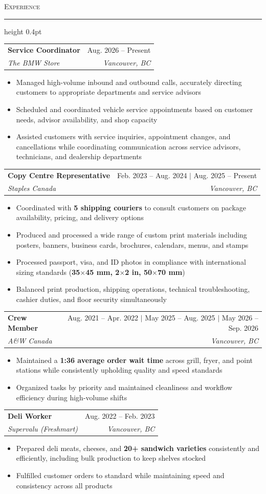 \documentclass[letterpaper,11pt]{article}
\makeatletter
\newcommand{\resumesection}[1]{%
  \vspace{4pt}%
  {\large\scshape #1}\vspace{1.5pt}%
  \hrule height 0.4pt%
  \vspace{3pt}%
}
\newcommand{\resumeSubheading}[4]{%
  \vspace{1.5pt}%
  \noindent\begin{tabular*}{\textwidth}{@{\extracolsep{\fill}}l r@{}}
    \textbf{#1} & #2 \\
    \textit{\small #3} & \textit{\small #4} \\
  \end{tabular*}\vspace{-4pt}%
}
\newcommand{\resumeItemListStart}{%
  \begin{itemize}%
    \setlength{\itemsep}{0.5pt}%
    \setlength{\parskip}{0pt}%
    \setlength{\parsep}{0pt}%
    \setlength{\topsep}{1.5pt}%
}
\newcommand{\resumeItemListEnd}{\end{itemize}\vspace{-3pt}}
\newcommand{\resumeItem}[1]{%
  \item\small{#1}%
}
\makeatother
\begin{document}
\newpage

\resumesection{Experience}

\resumeSubheading
  {Service Coordinator}{Aug. 2026 -- Present}
  {The BMW Store}{Vancouver, BC}
\resumeItemListStart
  \resumeItem{Managed high-volume inbound and outbound calls, accurately directing customers to appropriate departments and service advisors}
  \resumeItem{Scheduled and coordinated vehicle service appointments based on customer needs, advisor availability, and shop capacity}
  \resumeItem{Assisted customers with service inquiries, appointment changes, and cancellations while coordinating communication across service advisors, technicians, and dealership departments}
\resumeItemListEnd

\resumeSubheading
  {Copy Centre Representative}{Feb. 2023 -- Aug. 2024 $|$ Aug. 2025 -- Present}
  {Staples Canada}{Vancouver, BC}
\resumeItemListStart
  \resumeItem{Coordinated with \textbf{5 shipping couriers} to consult customers on package availability, pricing, and delivery options}
  \resumeItem{Produced and processed a wide range of custom print materials including posters, banners, business cards, brochures, calendars, menus, and stamps}
  \resumeItem{Processed passport, visa, and ID photos in compliance with international sizing standards (\textbf{35$\times$45 mm, 2$\times$2 in, 50$\times$70 mm})}
  \resumeItem{Balanced print production, shipping operations, technical troubleshooting, cashier duties, and floor security simultaneously}
\resumeItemListEnd

\resumeSubheading
  {Crew Member}{Aug. 2021 -- Apr. 2022 $|$ May 2025 -- Aug. 2025 $|$ May 2026 -- Sep. 2026}
  {A\&W Canada}{Vancouver, BC}
\resumeItemListStart
  \resumeItem{Maintained a \textbf{1:36 average order wait time} across grill, fryer, and point stations while consistently upholding quality and speed standards}
  \resumeItem{Organized tasks by priority and maintained cleanliness and workflow efficiency during high-volume shifts}
\resumeItemListEnd

\resumeSubheading
  {Deli Worker}{Aug. 2022 -- Feb. 2023}
  {Supervalu (Freshmart)}{Vancouver, BC}
\resumeItemListStart
  \resumeItem{Prepared deli meats, cheeses, and \textbf{20+ sandwich varieties} consistently and efficiently, including bulk production to keep shelves stocked}
  \resumeItem{Fulfilled customer orders to standard while maintaining speed and consistency across all products}
\resumeItemListEnd
\end{document}
